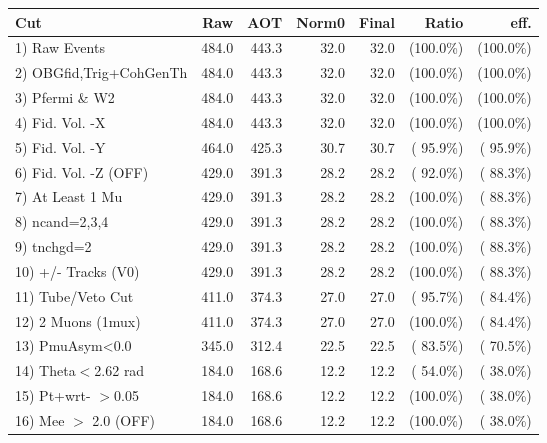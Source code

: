  \begin{table}[h!]\centering
 \begin{tabular}{||l||r|r|r|r|r|r||}
 \hline
 \hline
 Cut & Raw & AOT & Norm0 & Final & Ratio & eff.       \\
 \hline
  1) Raw Events           &        484.0 &        443.3 &         32.0 &         32.0 & (100.0\%) & (100.0\%) \\
  2) OBGfid,Trig+CohGenTh &        484.0 &        443.3 &         32.0 &         32.0 & (100.0\%) & (100.0\%) \\
  3) Pfermi \& W2         &        484.0 &        443.3 &         32.0 &         32.0 & (100.0\%) & (100.0\%) \\
  4) Fid. Vol. -X         &        484.0 &        443.3 &         32.0 &         32.0 & (100.0\%) & (100.0\%) \\
  5) Fid. Vol. -Y         &        464.0 &        425.3 &         30.7 &         30.7 & ( 95.9\%) & ( 95.9\%) \\
  6) Fid. Vol. -Z (OFF)   &        429.0 &        391.3 &         28.2 &         28.2 & ( 92.0\%) & ( 88.3\%) \\
  7) At Least 1 Mu        &        429.0 &        391.3 &         28.2 &         28.2 & (100.0\%) & ( 88.3\%) \\
  8) ncand=2,3,4          &        429.0 &        391.3 &         28.2 &         28.2 & (100.0\%) & ( 88.3\%) \\
  9) tnchgd=2             &        429.0 &        391.3 &         28.2 &         28.2 & (100.0\%) & ( 88.3\%) \\
 10) +/- Tracks (V0)      &        429.0 &        391.3 &         28.2 &         28.2 & (100.0\%) & ( 88.3\%) \\
 11) Tube/Veto Cut        &        411.0 &        374.3 &         27.0 &         27.0 & ( 95.7\%) & ( 84.4\%) \\
 12) 2 Muons (1mux)       &        411.0 &        374.3 &         27.0 &         27.0 & (100.0\%) & ( 84.4\%) \\
 13) PmuAsym<0.0          &        345.0 &        312.4 &         22.5 &         22.5 & ( 83.5\%) & ( 70.5\%) \\
 14) Theta$<$2.62 rad     &        184.0 &        168.6 &         12.2 &         12.2 & ( 54.0\%) & ( 38.0\%) \\
 15) Pt+wrt- $>$0.05      &        184.0 &        168.6 &         12.2 &         12.2 & (100.0\%) & ( 38.0\%) \\
 16) Mee $>$ 2.0  (OFF)   &        184.0 &        168.6 &         12.2 &         12.2 & (100.0\%) & ( 38.0\%) \\

\end{tabular}
\end{table}
